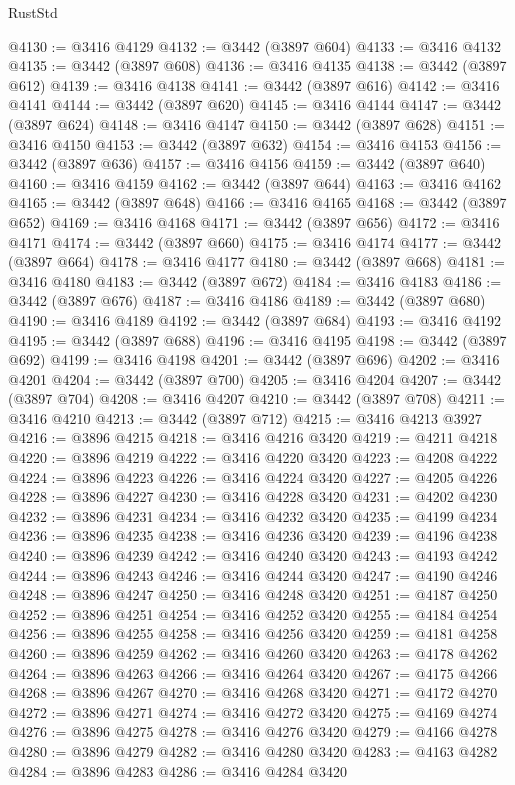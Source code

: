 \begin{lexlean}{RustStd}
\begin{coremodule}
@4130 := @3416 @4129
@4132 := @3442 (@3897 @604)
@4133 := @3416 @4132
@4135 := @3442 (@3897 @608)
@4136 := @3416 @4135
@4138 := @3442 (@3897 @612)
@4139 := @3416 @4138
@4141 := @3442 (@3897 @616)
@4142 := @3416 @4141
@4144 := @3442 (@3897 @620)
@4145 := @3416 @4144
@4147 := @3442 (@3897 @624)
@4148 := @3416 @4147
@4150 := @3442 (@3897 @628)
@4151 := @3416 @4150
@4153 := @3442 (@3897 @632)
@4154 := @3416 @4153
@4156 := @3442 (@3897 @636)
@4157 := @3416 @4156
@4159 := @3442 (@3897 @640)
@4160 := @3416 @4159
@4162 := @3442 (@3897 @644)
@4163 := @3416 @4162
@4165 := @3442 (@3897 @648)
@4166 := @3416 @4165
@4168 := @3442 (@3897 @652)
@4169 := @3416 @4168
@4171 := @3442 (@3897 @656)
@4172 := @3416 @4171
@4174 := @3442 (@3897 @660)
@4175 := @3416 @4174
@4177 := @3442 (@3897 @664)
@4178 := @3416 @4177
@4180 := @3442 (@3897 @668)
@4181 := @3416 @4180
@4183 := @3442 (@3897 @672)
@4184 := @3416 @4183
@4186 := @3442 (@3897 @676)
@4187 := @3416 @4186
@4189 := @3442 (@3897 @680)
@4190 := @3416 @4189
@4192 := @3442 (@3897 @684)
@4193 := @3416 @4192
@4195 := @3442 (@3897 @688)
@4196 := @3416 @4195
@4198 := @3442 (@3897 @692)
@4199 := @3416 @4198
@4201 := @3442 (@3897 @696)
@4202 := @3416 @4201
@4204 := @3442 (@3897 @700)
@4205 := @3416 @4204
@4207 := @3442 (@3897 @704)
@4208 := @3416 @4207
@4210 := @3442 (@3897 @708)
@4211 := @3416 @4210
@4213 := @3442 (@3897 @712)
@4215 := @3416 @4213 @3927
@4216 := @3896 @4215
@4218 := @3416 @4216 @3420
@4219 := @4211 @4218
@4220 := @3896 @4219
@4222 := @3416 @4220 @3420
@4223 := @4208 @4222
@4224 := @3896 @4223
@4226 := @3416 @4224 @3420
@4227 := @4205 @4226
@4228 := @3896 @4227
@4230 := @3416 @4228 @3420
@4231 := @4202 @4230
@4232 := @3896 @4231
@4234 := @3416 @4232 @3420
@4235 := @4199 @4234
@4236 := @3896 @4235
@4238 := @3416 @4236 @3420
@4239 := @4196 @4238
@4240 := @3896 @4239
@4242 := @3416 @4240 @3420
@4243 := @4193 @4242
@4244 := @3896 @4243
@4246 := @3416 @4244 @3420
@4247 := @4190 @4246
@4248 := @3896 @4247
@4250 := @3416 @4248 @3420
@4251 := @4187 @4250
@4252 := @3896 @4251
@4254 := @3416 @4252 @3420
@4255 := @4184 @4254
@4256 := @3896 @4255
@4258 := @3416 @4256 @3420
@4259 := @4181 @4258
@4260 := @3896 @4259
@4262 := @3416 @4260 @3420
@4263 := @4178 @4262
@4264 := @3896 @4263
@4266 := @3416 @4264 @3420
@4267 := @4175 @4266
@4268 := @3896 @4267
@4270 := @3416 @4268 @3420
@4271 := @4172 @4270
@4272 := @3896 @4271
@4274 := @3416 @4272 @3420
@4275 := @4169 @4274
@4276 := @3896 @4275
@4278 := @3416 @4276 @3420
@4279 := @4166 @4278
@4280 := @3896 @4279
@4282 := @3416 @4280 @3420
@4283 := @4163 @4282
@4284 := @3896 @4283
@4286 := @3416 @4284 @3420

\end{coremodule}
\end{lexlean}
